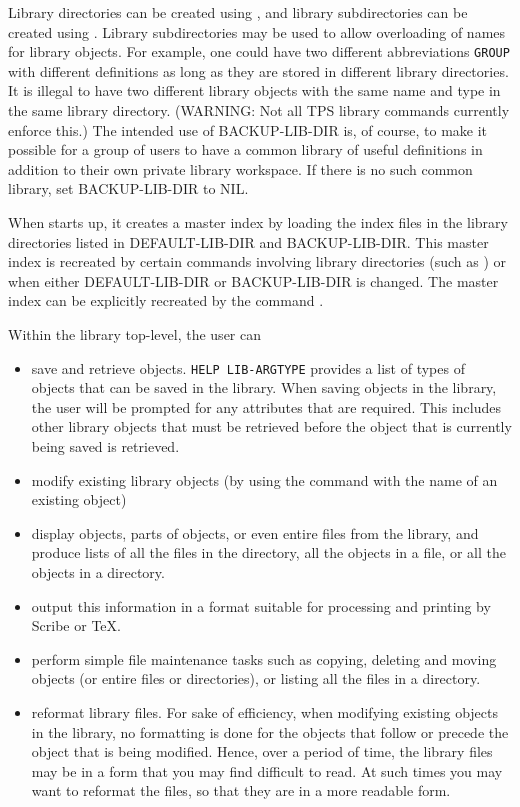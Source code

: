 Library directories can be created using , and
library subdirectories can be created using .
Library subdirectories may be used to allow overloading of names for library objects.
For example, one could have two different abbreviations {\tt GROUP} with different
definitions as long as they are stored in different library directories.
It is illegal to have two different library objects with the same name and type in the same
library directory.  (WARNING:  Not all TPS library commands currently enforce this.)
The intended use of BACKUP-LIB-DIR is, of course, to make it possible for a group of
users to have a common library of useful definitions in addition to their own private library
workspace. If there is no such common library, set BACKUP-LIB-DIR to NIL.

When {\TPS} starts up,
it creates a master index by loading the index files in the library directories listed
in DEFAULT-LIB-DIR and BACKUP-LIB-DIR.  This master index is recreated by certain
commands involving library directories (such as ) or when either
DEFAULT-LIB-DIR
or BACKUP-LIB-DIR is changed.  The master index can be explicitly recreated by
the command .

Within the library top-level, the user can
\begin{itemize}
\item save and retrieve {\TPS} objects. {\tt HELP LIB-ARGTYPE} provides a list of types of objects
that can be saved in the library. When saving objects in the library, the user
will be prompted for any attributes that are required. This includes other
library objects that must be retrieved before the object that is currently
being saved is retrieved.

\item modify existing library objects (by using the 
command with the name of an existing object)

\item display objects, parts of objects, or even entire files from the library, and produce lists of
all the files in the directory, all the objects in a file, or all the objects in a directory.

\item output this information in a format suitable for processing and printing by Scribe or TeX.

\item perform simple file maintenance tasks such as copying, deleting and moving objects
(or entire files or directories), or listing all the files in a directory.

\item reformat library files. For sake of efficiency, when modifying existing
objects in the library, no formatting is done for the objects that
follow or precede the object that is being modified. Hence, over a period
of time, the library files may be in a form that you may find difficult to
read. At such times you may want to reformat the files, so that they are
in a more readable form.
\end{itemize}

